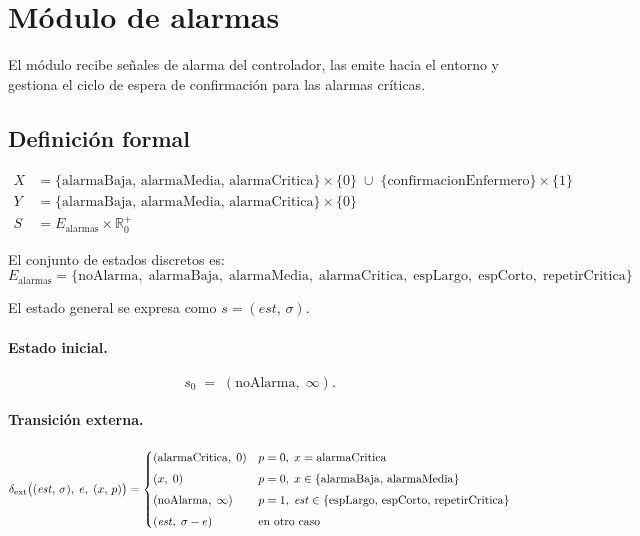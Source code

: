 \section{Módulo de alarmas}

El módulo recibe señales de alarma del controlador, las emite hacia el entorno y gestiona el ciclo de espera de confirmación para las alarmas críticas.

\subsection{Definición formal}

\begin{align*}
  X &= \{\mathrm{alarmaBaja},\,\mathrm{alarmaMedia},\,\mathrm{alarmaCritica}\}
       \!\times\!\{0\}
     \;\cup\; \{\mathrm{confirmacionEnfermero}\}\!\times\!\{1\} \\[4pt]
  Y &= \{\mathrm{alarmaBaja},\,\mathrm{alarmaMedia},\,\mathrm{alarmaCritica}\}
       \!\times\!\{0\} \\[4pt]
  S &= E_{\mathrm{alarmas}} \times \mathbb{R}_0^+
\end{align*}

El conjunto de estados discretos es:
\[
  E_{\mathrm{alarmas}} = \{
    \mathrm{noAlarma},\;
    \mathrm{alarmaBaja},\;
    \mathrm{alarmaMedia},\;
    \mathrm{alarmaCritica},\;
    \mathrm{espLargo},\;
    \mathrm{espCorto},\;
    \mathrm{repetirCritica}
  \}
\]

El estado general se expresa como $s = (\mathit{est},\,\sigma)$.

\paragraph{Estado inicial.}
\[
  s_0 \;=\; (\mathrm{noAlarma},\;\infty).
\]

\paragraph{Transición externa.}
\[
\delta_{\mathrm{ext}}\bigl((\mathit{est},\,\sigma),\;e,\;(x,\,p)\bigr) =
\begin{cases}
  (\mathrm{alarmaCritica},\;0)
    & p=0,\;x=\mathrm{alarmaCritica} \\[4pt]
  (x,\;0)
    & p=0,\;x\in\{\mathrm{alarmaBaja},\,\mathrm{alarmaMedia}\} \\[4pt]
  (\mathrm{noAlarma},\;\infty)
    & p=1,\;\mathit{est}\in\{\mathrm{espLargo},\,\mathrm{espCorto},\,\mathrm{repetirCritica}\} \\[4pt]
  (\mathit{est},\;\sigma - e)
    & \text{en otro caso}
\end{cases}
\]

